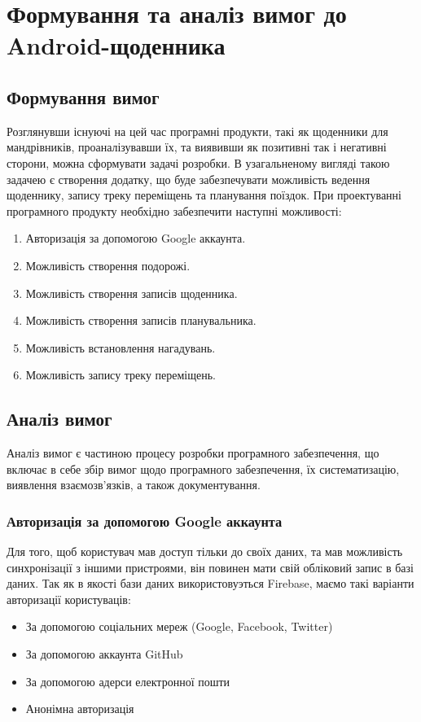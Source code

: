 \documentclass[../main.tex]{subfiles}
\begin{document}
\chapter{Формування та аналіз вимог до Android-щоденника}

\section{Формування вимог}

Розглянувши існуючі на цей час програмні продукти, такі як щоденники для мандрівників, проаналізувавши їх, та виявивши як позитивні так і негативні сторони, можна сформувати задачі розробки. В узагальненому вигляді такою задачею є створення додатку, що буде забезпечувати можливість ведення щоденнику, запису треку переміщень та планування поїздок.
При проектуванні програмного продукту необхідно забезпечити наступні можливості:

\begin{enumerate}
	\item Авторизація за допомогою Google аккаунта.
	\item Можливість створення подорожі.
	\item Можливість створення записів щоденника.
	\item Можливість створення записів планувальника.
	\item Можливість встановлення нагадувань.
	\item Можливість запису треку переміщень.
\end{enumerate}

\section{Аналіз вимог}

Аналіз вимог є частиною процесу розробки програмного забезпечення, що включає в себе збір вимог щодо програмного забезпечення, їх систематизацію, виявлення взаємозв'язків, а також документування.

\subsection{Авторизація за допомогою Google аккаунта}
Для того, щоб користувач мав доступ тільки до своїх даних, та мав можливість синхронізації з іншими пристроями, він повинен мати свій обліковий запис в базі даних. Так як в якості бази даних використовуэться Firebase, маємо такі варіанти авторизації користуваців: 
\begin{itemize}
	\item За допомогою соціальних мереж (Google, Facebook, Twitter)
	\item За допомогою аккаунта GitHub
	\item За допомогою адерси електронної пошти
	\item Анонімна авторизація
\end{itemize}
\end{document}
